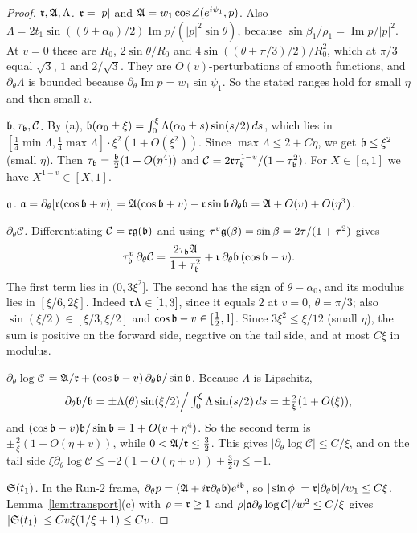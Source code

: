 \begin{proof}
\emph{$\mathfrak{r},\mathfrak{A},\Lambda$.} $\mathfrak{r}=|p|$ and $\mathfrak{A}=w_1\cos\angle(e^{i\psi_1},p)$. Also
$\Lambda=2t_1\sin((\theta+\alpha_0)/2)\operatorname{Im}p/(|p|^2\sin\theta)$, because $\sin\beta_1/\rho_1=\operatorname{Im}p/|p|^2$. At $v=0$
these are $R_0$, $2\sin\theta/R_0$ and $4\sin((\theta+\pi/3)/2)/R_0^2$, which at $\pi/3$ equal $\sqrt3$, $1$ and $2/\sqrt3$. They are
$O(v)$-perturbations of smooth functions, and $\partial_\theta\Lambda$ is bounded because $\partial_\theta\operatorname{Im}p=w_1\sin\psi_1$.
So the stated ranges hold for small $\eta$ and then small $v$.

\emph{$\mathfrak{b},\tau_{\mathfrak{b}},\mathcal C$.} By (a), $\mathfrak{b}(\alpha_0\pm\xi)=\int_0^\xi\Lambda(\alpha_0\pm s)\sin(s/2)\,ds$, which lies in
$[\frac14\min\Lambda,\frac14\max\Lambda]\cdot\xi^2(1+O(\xi^2))$. Since $\max\Lambda\le2+C\eta$, we get $\mathfrak{b}\le\xi^2$
(small $\eta$). Then $\tau_{\mathfrak{b}}=\frac{\mathfrak{b}}{2}(1+O(\eta^4))$ and $\mathcal C=2\mathfrak{r}\tau_{\mathfrak{b}}^{1-v}/(1+\tau_{\mathfrak{b}}^2)$. For $X\in[c,1]$ we have
$X^{1-v}\in[X,1]$.

\emph{$\mathfrak{a}$.} $\mathfrak{a}=\partial_\theta[\mathfrak{r}(\cos\mathfrak{b}+v)]=\mathfrak{A}(\cos\mathfrak{b}+v)-\mathfrak{r}\sin\mathfrak{b}\,\partial_\theta\mathfrak{b}=\mathfrak{A}+O(v)+O(\eta^3)$.

\emph{$\partial_\theta\mathcal C$.} Differentiating $\mathcal C=\mathfrak{r}\mathfrak{g}(\mathfrak{b})$ and using $\tau^v\mathfrak{g}(\beta)=\sin\beta=2\tau/(1+\tau^2)$ gives
\[
\tau_{\mathfrak{b}}^v\,\partial_\theta\mathcal C=\frac{2\tau_{\mathfrak{b}}\mathfrak{A}}{1+\tau_{\mathfrak{b}}^2}+\mathfrak{r}\,\partial_\theta\mathfrak{b}\,(\cos\mathfrak{b}-v).
\]
The first term lies in $(0,3\xi^2]$. The second has the sign of $\theta-\alpha_0$, and its modulus lies in $[\xi/6,2\xi]$. Indeed
$\mathfrak{r}\Lambda\in[1,3]$, since it equals $2$ at $v=0$, $\theta=\pi/3$; also $\sin(\xi/2)\in[\xi/3,\xi/2]$ and $\cos\mathfrak{b}-v\in[\frac12,1]$.
Since $3\xi^2\le\xi/12$ (small $\eta$), the sum is positive on the forward side, negative on the tail side, and at most $C\xi$ in
modulus.

\emph{$\partial_\theta\log\mathcal C$} $=\mathfrak{A}/\mathfrak{r}+(\cos\mathfrak{b}-v)\,\partial_\theta\mathfrak{b}/\sin\mathfrak{b}$. Because $\Lambda$ is Lipschitz,
\[
\partial_\theta\mathfrak{b}/\mathfrak{b}=\pm\Lambda(\theta)\sin(\xi/2)\Big/\textstyle\int_0^\xi\Lambda\sin(s/2)\,ds=\pm\frac2\xi(1+O(\xi)),
\]
and
$(\cos\mathfrak{b}-v)\mathfrak{b}/\sin\mathfrak{b}=1+O(v+\eta^4)$. So the second term is $\pm\frac2\xi(1+O(\eta+v))$, while $0<\mathfrak{A}/\mathfrak{r}\le\frac32$. This gives
$|\partial_\theta\log\mathcal C|\le C/\xi$, and on the tail side $\xi\partial_\theta\log\mathcal C\le-2(1-O(\eta+v))+\frac32\eta\le-1$.

\emph{$\mathfrak{S}(t_1)$.} In the Run-2 frame, $\partial_\theta p=(\mathfrak{A}+i\mathfrak{r}\partial_\theta\mathfrak{b})e^{i\mathfrak{b}}$, so
$|\sin\phi|=\mathfrak{r}|\partial_\theta\mathfrak{b}|/w_1\le C\xi$. Lemma~\ref{lem:transport}(c) with $\rho=\mathfrak{r}\ge1$ and
$\rho|\mathfrak{a}\partial_\theta\log\mathcal C|/w^2\le C/\xi$ gives $|\mathfrak{S}(t_1)|\le Cv\xi(1/\xi+1)\le Cv$.
\end{proof}

